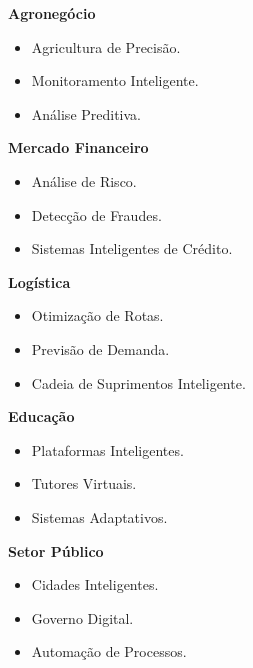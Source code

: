 \textbf{Agronegócio}
\begin{itemize}
    \item Agricultura de Precisão.
    \item Monitoramento Inteligente.
    \item Análise Preditiva.
\end{itemize}

\textbf{Mercado Financeiro}
\begin{itemize}
    \item Análise de Risco.
    \item Detecção de Fraudes.
    \item Sistemas Inteligentes de Crédito.
\end{itemize}

\textbf{Logística}
\begin{itemize}
    \item Otimização de Rotas.
    \item Previsão de Demanda.
    \item Cadeia de Suprimentos Inteligente.
\end{itemize}

\textbf{Educação}
\begin{itemize}
    \item Plataformas Inteligentes.
    \item Tutores Virtuais.
    \item Sistemas Adaptativos.
\end{itemize}

\textbf{Setor Público}
\begin{itemize}
    \item Cidades Inteligentes.
    \item Governo Digital.
    \item Automação de Processos.
\end{itemize}
